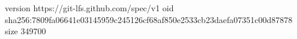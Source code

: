 version https://git-lfs.github.com/spec/v1
oid sha256:7809fa06641e03145959c245126cf68af850e2533cb23daefa07351c00d87878
size 349700
